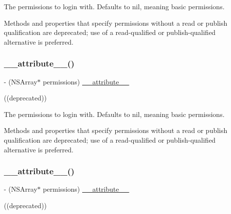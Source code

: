 The permissions to login with. Defaults to nil, meaning basic permissions.

Methods and properties that specify permissions without a read or publish qualification are deprecated; use of a read-\/qualified or publish-\/qualified alternative is preferred. \mbox{\label{interfaceFBLoginView_aed5ee6aec67e5fd04eed62c4ff09b9f4}} 
\subsubsection{\texorpdfstring{\+\_\+\+\_\+attribute\+\_\+\+\_\+()}{\_\_attribute\_\_()}\hspace{0.1cm}{\footnotesize\ttfamily [3/5]}}
{\footnotesize\ttfamily -\/ (N\+S\+Array$\ast$ permissions) \hyperlink{struct____attribute____}{\+\_\+\+\_\+attribute\+\_\+\+\_\+} \begin{DoxyParamCaption}\item[{((deprecated))}]{ }\end{DoxyParamCaption}}

The permissions to login with. Defaults to nil, meaning basic permissions.

Methods and properties that specify permissions without a read or publish qualification are deprecated; use of a read-\/qualified or publish-\/qualified alternative is preferred. \mbox{\label{interfaceFBLoginView_aed5ee6aec67e5fd04eed62c4ff09b9f4}} 
\subsubsection{\texorpdfstring{\+\_\+\+\_\+attribute\+\_\+\+\_\+()}{\_\_attribute\_\_()}\hspace{0.1cm}{\footnotesize\ttfamily [4/5]}}
{\footnotesize\ttfamily -\/ (N\+S\+Array$\ast$ permissions) \hyperlink{struct____attribute____}{\+\_\+\+\_\+attribute\+\_\+\+\_\+} \begin{DoxyParamCaption}\item[{((deprecated))}]{ }\end{DoxyParamCaption}}

